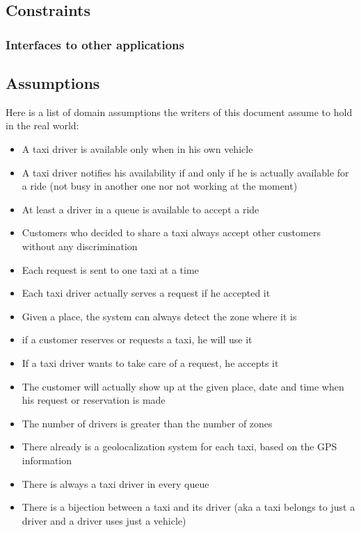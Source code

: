 \pagebreak
\subsection{Constraints}

\subsubsection{Interfaces to other applications}

\subsection{Assumptions}
Here is a list of domain assumptions the writers of this document assume to hold in the real world:
\begin{itemize}
    \item A taxi driver is available only when in his own vehicle 
    \item A taxi driver notifies his availability if and only if he is actually available for a ride (not busy in another one nor not working at the moment)
    \item At least a driver in a queue is available to accept a ride
    \item Customers who decided to share a taxi always accept other customers without any discrimination
    \item Each request is sent to one taxi at a time
    \item Each taxi driver actually serves a request if he accepted it
    \item Given a place, the system can always detect the zone where it is
    \item if a customer reserves or requests a taxi, he will use it
    \item If a taxi driver wants to take care of a request, he accepts it
    \item The customer will actually show up at the given place, date and time when his request or reservation is made
    \item The number of drivers is greater than the number of zones
    \item There already is a geolocalization system for each taxi, based on the GPS information
    \item There is always a taxi driver in every queue
    \item There is a bijection between a taxi and its driver (aka a taxi belongs to just a driver and a driver uses just a vehicle)
\end{itemize}
